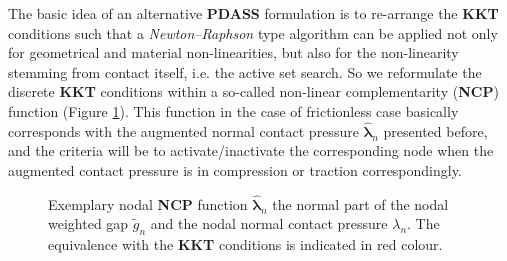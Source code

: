 \documentclass[a4paper,10pt]{article} %
\begin{document}
The basic idea of an alternative \textbf{PDASS} formulation is to re-arrange the \textbf{KKT} conditions such that a \textit{Newton–Raphson} type algorithm can be applied not only for geometrical and material non-linearities, but also for the non-linearity stemming from contact itself, i.e. the active set search. So we reformulate the discrete \textbf{KKT} conditions within a so-called non-linear complementarity (\textbf{NCP}) function (Figure \ref{fig:ncp}). This function in the case of frictionless case basically corresponds with the augmented normal contact pressure $\hat{\boldsymbol{\lambda}}_n$ presented before, and the criteria will be to activate/inactivate the corresponding node when the augmented contact pressure is in compression or traction correspondingly.

\begin{figure}[h]
\begin{center}
\caption{Exemplary nodal \textbf{NCP} function $\hat{\boldsymbol{\lambda}}_n$ the normal part of the nodal weighted
gap $\tilde{g}_n$ and the nodal normal contact pressure $\lambda_n$. The equivalence with the \textbf{KKT} conditions is indicated in red colour.
}
\label{fig:ncp}
\end{center}
\end{figure}
\end{document}
